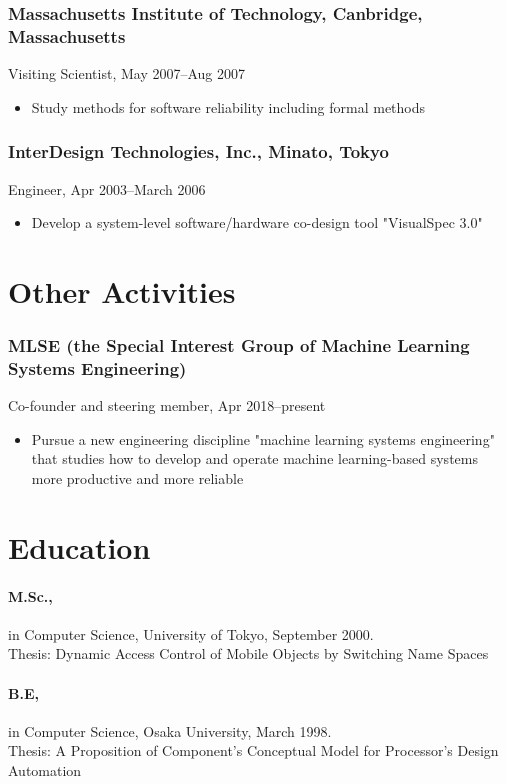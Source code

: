 \documentclass[a4paper,8pt]{report}
\begin{document}
\subsubsection*{Massachusetts Institute of Technology, Canbridge, Massachusetts}
Visiting Scientist, May 2007--Aug 2007
\begin{itemize}
    \item Study methods for software reliability including formal methods
\end{itemize}

\subsubsection*{InterDesign Technologies, Inc., Minato, Tokyo}
Engineer, Apr 2003--March 2006
\begin{itemize}
    \item Develop a system-level software/hardware co-design tool "VisualSpec 3.0"
\end{itemize}

\section*{Other Activities}
\subsubsection*{MLSE (the Special Interest Group of Machine Learning Systems Engineering)}
Co-founder and steering member, Apr 2018--present
\begin{itemize}
    \item Pursue a new engineering discipline "machine learning systems engineering" that studies how to develop and operate machine learning-based systems more productive and more reliable
\end{itemize}

\section*{Education}
\paragraph{M.Sc.,} in Computer Science, University of Tokyo, September 2000.\\
Thesis: Dynamic Access Control of Mobile Objects by Switching Name Spaces

\paragraph{B.E,} in Computer Science, Osaka University, March 1998.\\
Thesis: A Proposition of Component's Conceptual Model for Processor's Design Automation
\end{document}
